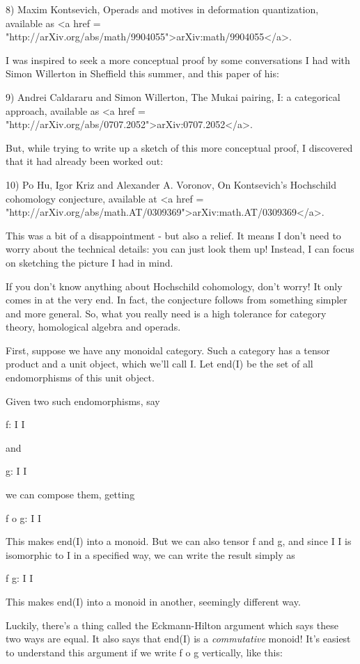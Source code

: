 8) Maxim Kontsevich, Operads and motives in deformation quantization,
available as <a href =
"http://arXiv.org/abs/math/9904055">arXiv:math/9904055</a>.

I was inspired to seek a more conceptual proof by some conversations 
I had with Simon Willerton in Sheffield this summer, and this paper 
of his:

9) Andrei Caldararu and Simon Willerton, The Mukai pairing, I: a
categorical approach, available as <a href =
"http://arXiv.org/abs/0707.2052">arXiv:0707.2052</a>.

But, while trying to write up a sketch of this more conceptual 
proof, I discovered that it had already been worked out:

10) Po Hu, Igor Kriz and Alexander A. Voronov, On Kontsevich's Hochschild
cohomology conjecture, available at <a href =
"http://arXiv.org/abs/math.AT/0309369">arXiv:math.AT/0309369</a>.

This was a bit of a disappointment - but also a relief.  It
means I don't need to worry about the technical details: you 
can just look them up!  Instead, I can focus on sketching the 
picture I had in mind.

If you don't know anything about Hochschild cohomology, don't worry!
It only comes in at the very end.  In fact, the conjecture
follows from something simpler and more general.  So, what you 
really need is a high tolerance for category theory, homological 
algebra and operads.

First, suppose we have any monoidal category.  Such a category
has a tensor product and a unit object, which we'll call I.  Let 
end(I) be the set of all endomorphisms of this unit object. 

Given two such endomorphisms, say 

f: I \to  I

and

g: I \to  I

we can compose them, getting

f o g: I \to  I

This makes end(I) into a monoid.  But we can also tensor f and
g, and since I \otimes  I is isomorphic to I in a specified way, 
we can write the result simply as

f \otimes  g: I \to  I

This makes end(I) into a monoid in another, seemingly different
way.  

Luckily, there's a thing called the Eckmann-Hilton argument which 
says these two ways are equal.  It also says that end(I) is a
\emph{commutative} monoid!  It's easiest to understand this argument 
if we write f o g vertically, like this:

